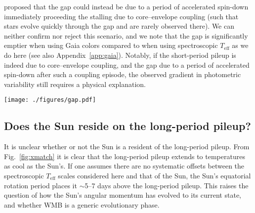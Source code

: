 \documentclass[trackchanges,twocolumn]{aastex631}
\newcommand{\lamostmcq}{LAMOST--McQuillan\xspace}
\newcommand{\mma}{MMA14\xspace}
\newcommand{\teff}{\ensuremath{T_{\mathrm{eff}}}\xspace}
\newcommand{\prot}{\ensuremath{P_\mathrm{rot}}\xspace}
\newcommand{\rper}{\ensuremath{R_\mathrm{per}}\xspace}
\begin{document}
\citet{Gordon2021} proposed that the gap could instead be due to a period of accelerated spin-down immediately proceeding the stalling due to core–envelope coupling (such that stars evolve quickly through the gap and are rarely observed there). We can neither confirm nor reject this scenario, and we note that the gap is significantly emptier when using Gaia colors \citep{DavenportCovey2018, Gordon2021} compared to when using spectroscopic \teff as we do here (see also Appendix~\ref{app:gaia}). Notably, if the short-period pileup is indeed due to core–envelope coupling, and the gap due to a period of accelerated spin-down after such a coupling episode, the observed gradient in photometric variability still requires a physical explanation.

\begin{figure*}
    \centering
    \texttt{[image: ./figures/gap.pdf]}
    \caption{The \teff--\prot distribution of the \lamostmcq (left) and \mma samples color coded by the variability amplitude, \rper. Black contours show Gaussian kernel density estimation of the plotted distributions, and the dashed line shows a constant Rossby curve of Ro~=~0.5.
    The long- and short-period pileups are separated by a relative dearth of stars with intermediate rotation periods. A strong gradient in \rper is apparent across this gap, such that variability amplitude reaches a local minimum near the gap's center.}
    \label{fig:gap}
\end{figure*}

\hfill\break
\subsection{Does the Sun reside on the long-period pileup?} \label{subsec:thesun}

It is unclear whether or not the Sun is a resident of the long-period pileup. From Fig.~\ref{fig:xmatch} it is clear that the long-period pileup extends to temperatures as cool as the Sun's. If one assumes there are no systematic offsets between the spectroscopic \teff scales considered here and that of the Sun, the Sun's equatorial rotation period places it $\sim$5--7 days above the long-period pileup. This raises the question of how the Sun's angular momentum has evolved to its current state, and whether WMB is a generic evolutionary phase. 
\end{document}
